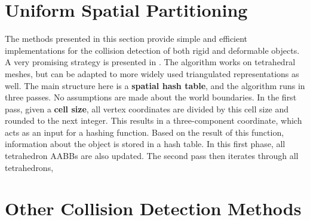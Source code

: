 






\section{Uniform Spatial Partitioning}
\label{sec:usp}

The methods presented in this section provide simple and efficient implementations for the collision detection of both rigid and deformable objects. A very promising strategy is presented in \citep{thm03}. The algorithm works on tetrahedral meshes, but can be adapted to more widely used triangulated representations as well. The main structure here is a \textbf{spatial hash table}, and the algorithm runs in three passes. No assumptions are made about the world boundaries. In the first pass, given a \textbf{cell size}, all vertex coordinates are divided by this cell size and rounded to the next integer. This results in a three-component coordinate, which acts as an input for a hashing function. Based on the result of this function, information about the object is stored in a hash table. In this first phase, all tetrahedron AABBs are also updated. The second pass then iterates through all tetrahedrons, 


\section{Other Collision Detection Methods}
\label{sec:others}

